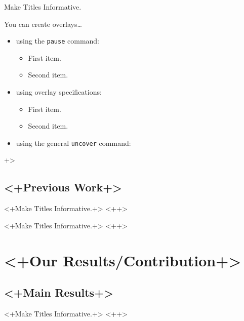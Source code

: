 \documentclass{beamer}
\begin{document}
\begin{frame}{Make Titles Informative.}

  You can create overlays\dots
  \begin{itemize}
  \item using the \texttt{pause} command:
    \begin{itemize}
    \item
      First item.
      \pause
    \item    
      Second item.
    \end{itemize}
  \item
    using overlay specifications:
    \begin{itemize}
    \item<3->
      First item.
    \item<4->
      Second item.
    \end{itemize}
  \item
    using the general \texttt{uncover} command:
    \begin{itemize}
    \end{itemize}
  \end{itemize}+>
\end{frame}


\subsection{<+Previous Work+>}

\begin{frame}{<+Make Titles Informative.+>}
    <++>
\end{frame}

\begin{frame}{<+Make Titles Informative.+>}
    <++>
\end{frame}



\section{<+Our Results/Contribution+>}

\subsection{<+Main Results+>}

\begin{frame}{<+Make Titles Informative.+>}
    <++>
\end{frame}
\end{document}
